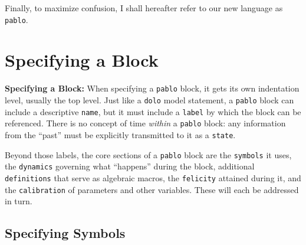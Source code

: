 \documentclass[12pt,pdftex,letterpaper]{article}
\begin{document}
Finally, to maximize confusion, I shall hereafter refer to our new language as \texttt{pablo}.


\section{Specifying a Block}

\noindent \textbf{Specifying a Block:} When specifying a \texttt{pablo} block, it gets its own indentation level, usually the top level. Just like a \texttt{dolo} model statement, a \texttt{pablo} block can include a descriptive \texttt{name}, but it must include a \texttt{label} by which the block can be referenced. There is no concept of time \textit{within} a \texttt{pablo} block: any information from the ``past'' must be explicitly transmitted to it as a \texttt{state}.

Beyond those labels, the core sections of a \texttt{pablo} block are the \texttt{symbols} it uses, the \texttt{dynamics} governing what ``happens'' during the block, additional \texttt{definitions} that serve as algebraic macros, the \texttt{felicity} attained during it, and the \texttt{calibration} of parameters and other variables. These will each be addressed in turn.

\subsection{Specifying Symbols}
\end{document}
